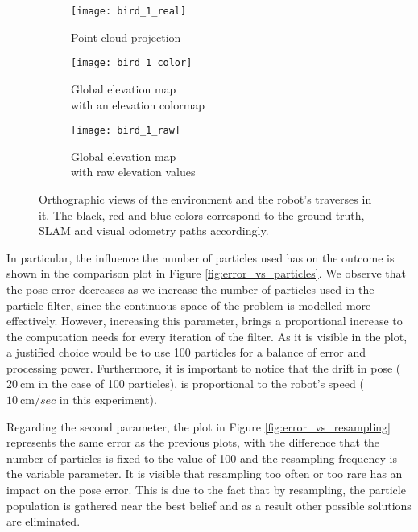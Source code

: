 \begin{figure}[t]
    \centering
    \begin{subfigure}{0.5\textwidth}
        \centering
        \texttt{[image: bird\_1\_real]}
        \caption{Point cloud projection}
        \label{fig:bird_1_real}
    \end{subfigure}
    \begin{subfigure}{0.5\textwidth}
        \centering
        \texttt{[image: bird\_1\_color]}
        \caption{Global elevation map\\with an elevation colormap}
        \label{fig:bird_1_color}
    \end{subfigure}%
    \begin{subfigure}{0.5\textwidth}
        \centering
        \texttt{[image: bird\_1\_raw]}
        \caption{Global elevation map\\with raw elevation values}
        \label{fig:bird_1_raw}
    \end{subfigure}
    \caption[Traverse of first experiment]{Orthographic views of the
        environment and the robot's traverses in it. The black, red and
        blue colors correspond to the ground truth, SLAM and visual odometry
        paths accordingly.}
    \label{fig:bird_1}
\end{figure}

In particular, the influence the number of particles used has on the outcome
is shown in the comparison plot in Figure \ref{fig:error_vs_particles}.
We observe that the pose error decreases as we increase the number of particles
used in the particle filter, since the continuous space of the problem
is modelled more effectively.
However, increasing this parameter, brings a proportional increase to
the computation needs for every iteration of the filter.
As it is visible in the plot, a justified choice would be to use 100
particles for a balance of error and processing power.
Furthermore, it is important to notice that the drift in pose ($\SI{20}{\cm}$
in the case of 100 particles), is proportional to the robot's speed
($\SI{10}{\cm \per sec}$ in this experiment).

Regarding the second parameter, the plot in Figure
\ref{fig:error_vs_resampling} represents the same error as the previous plots,
with the difference that the number of particles is fixed to the value of 100
and the resampling frequency is the variable parameter.
It is visible that resampling too often or too rare has an impact on the
pose error.
This is due to the fact that by resampling, the particle population is gathered
near the best belief and as a result other possible solutions are eliminated.

